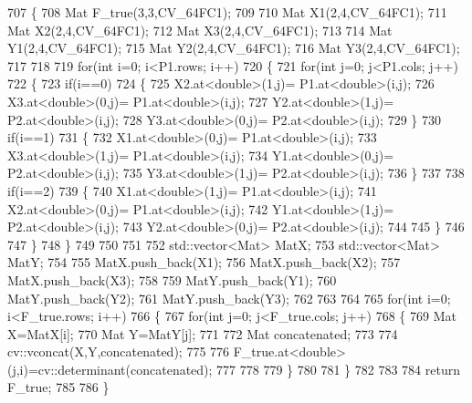 \begin{DoxyCode}
707 \{
708     Mat F\_true(3,3,CV\_64FC1);
709 
710     Mat X1(2,4,CV\_64FC1);
711     Mat X2(2,4,CV\_64FC1);
712     Mat X3(2,4,CV\_64FC1);
713 
714     Mat Y1(2,4,CV\_64FC1);
715     Mat Y2(2,4,CV\_64FC1);
716     Mat Y3(2,4,CV\_64FC1);
717     
718 
719     \textcolor{keywordflow}{for}(\textcolor{keywordtype}{int} i=0; i<P1.rows; i++)
720     \{
721         \textcolor{keywordflow}{for}(\textcolor{keywordtype}{int} j=0; j<P1.cols; j++)
722         \{
723             \textcolor{keywordflow}{if}(i==0)
724             \{
725                 X2.at<\textcolor{keywordtype}{double}>(1,j)= P1.at<\textcolor{keywordtype}{double}>(i,j);
726                 X3.at<\textcolor{keywordtype}{double}>(0,j)= P1.at<\textcolor{keywordtype}{double}>(i,j);
727                 Y2.at<\textcolor{keywordtype}{double}>(1,j)= P2.at<\textcolor{keywordtype}{double}>(i,j);
728                 Y3.at<\textcolor{keywordtype}{double}>(0,j)= P2.at<\textcolor{keywordtype}{double}>(i,j);                    
729             \}
730             \textcolor{keywordflow}{if}(i==1)
731             \{
732                 X1.at<\textcolor{keywordtype}{double}>(0,j)= P1.at<\textcolor{keywordtype}{double}>(i,j);
733                 X3.at<\textcolor{keywordtype}{double}>(1,j)= P1.at<\textcolor{keywordtype}{double}>(i,j);
734                 Y1.at<\textcolor{keywordtype}{double}>(0,j)= P2.at<\textcolor{keywordtype}{double}>(i,j);
735                 Y3.at<\textcolor{keywordtype}{double}>(1,j)= P2.at<\textcolor{keywordtype}{double}>(i,j);                   
736             \}
737 
738             \textcolor{keywordflow}{if}(i==2)
739             \{
740                 X1.at<\textcolor{keywordtype}{double}>(1,j)= P1.at<\textcolor{keywordtype}{double}>(i,j);
741                 X2.at<\textcolor{keywordtype}{double}>(0,j)= P1.at<\textcolor{keywordtype}{double}>(i,j);
742                 Y1.at<\textcolor{keywordtype}{double}>(1,j)= P2.at<\textcolor{keywordtype}{double}>(i,j);
743                 Y2.at<\textcolor{keywordtype}{double}>(0,j)= P2.at<\textcolor{keywordtype}{double}>(i,j);
744 
745             \}
746 
747         \}
748     \}
749 
750 
751 
752     std::vector<Mat> MatX;
753     std::vector<Mat> MatY;
754 
755     MatX.push\_back(X1);
756     MatX.push\_back(X2);
757     MatX.push\_back(X3);
758 
759     MatY.push\_back(Y1);
760     MatY.push\_back(Y2);
761     MatY.push\_back(Y3);
762 
763 
764 
765     \textcolor{keywordflow}{for}(\textcolor{keywordtype}{int} i=0; i<F\_true.rows; i++)
766     \{
767         \textcolor{keywordflow}{for}(\textcolor{keywordtype}{int} j=0; j<F\_true.cols; j++)
768         \{
769             Mat X=MatX[i];
770             Mat Y=MatY[j];
771 
772             Mat concatenated;
773 
774             cv::vconcat(X,Y,concatenated);
775 
776             F\_true.at<\textcolor{keywordtype}{double}>(j,i)=cv::determinant(concatenated);
777 
778 
779         \}
780 
781     \}
782 
783 
784     \textcolor{keywordflow}{return} F\_true;
785 
786 \}
\end{DoxyCode}
